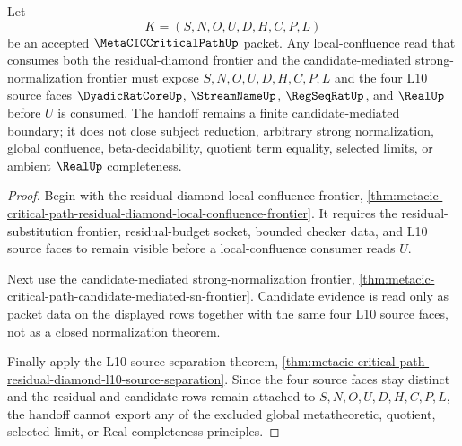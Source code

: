 \begin{theorem}
\label{thm:metacic-critical-path-candidate-sn-confluence-handoff}
Let
$$
K=(S,N,O,U,D,H,C,P,L)
$$
be an accepted $\MetaCICCriticalPathUp$ packet. Any local-confluence read that consumes both the residual-diamond frontier and the candidate-mediated strong-normalization frontier must expose $S,N,O,U,D,H,C,P,L$ and the four L10 source faces $\DyadicRatCoreUp$, $\StreamNameUp$, $\RegSeqRatUp$, and $\RealUp$ before $U$ is consumed. The handoff remains a finite candidate-mediated boundary; it does not close subject reduction, arbitrary strong normalization, global confluence, beta-decidability, quotient term equality, selected limits, or ambient $\RealUp$ completeness.
\end{theorem}
\begin{proof}
Begin with the residual-diamond local-confluence frontier, \autoref{thm:metacic-critical-path-residual-diamond-local-confluence-frontier}. It requires the residual-substitution frontier, residual-budget socket, bounded checker data, and L10 source faces to remain visible before a local-confluence consumer reads $U$.

Next use the candidate-mediated strong-normalization frontier, \autoref{thm:metacic-critical-path-candidate-mediated-sn-frontier}. Candidate evidence is read only as packet data on the displayed rows together with the same four L10 source faces, not as a closed normalization theorem.

Finally apply the L10 source separation theorem, \autoref{thm:metacic-critical-path-residual-diamond-l10-source-separation}. Since the four source faces stay distinct and the residual and candidate rows remain attached to $S,N,O,U,D,H,C,P,L$, the handoff cannot export any of the excluded global metatheoretic, quotient, selected-limit, or Real-completeness principles.
\end{proof}


